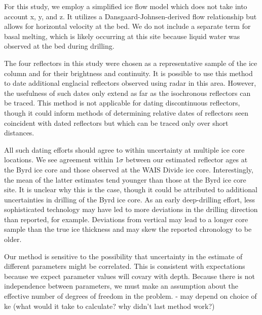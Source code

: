 For this study, we employ a simplified ice flow model which does not take into account x, y, and z. It utilizes a Dansgaard-Johnsen-derived flow relationship but allows for horizontal velocity at the bed. We do not include a separate term for basal melting, which is likely occurring at this site because liquid water was observed at the bed during drilling. 

The four reflectors in this study were chosen as a representative sample of the ice column and for their brightness and continuity. It is possible to use this method to date additional englacial reflectors observed using radar in this area. However, the usefulness of such dates only extend as far as the isochronous reflectors can be traced. This method is not applicable for dating discontinuous reflectors, though it could inform methods of determining relative dates of reflectors seen coincident with dated reflectors but which can be traced only over short distances. 

All such dating efforts should agree to within uncertainty at multiple ice core locations. We see agreement within 1$\sigma$ between our estimated reflector ages at the Byrd ice core and those observed at the WAIS Divide ice core. Interestingly, the mean of the latter estimates tend younger than those at the Byrd ice core site. It is unclear why this is the case, though it could be attributed to additional uncertainties in drilling of the Byrd ice core. As an early deep-drilling effort, less sophisticated technology may have led to more deviations in the drilling direction than reported, for example. Deviations from vertical may lead to a longer core sample than the true ice thickness and may skew the reported chronology to be older.

Our method is sensitive to the possibility that uncertainty in the estimate of different parameters might be correlated. This is consistent with expectations because we expect parameter values will covary with depth. Because there is not independence between parameters, we must make an assumption about the effective number of degrees of freedom in the problem. 
- may depend on choice of ke (what would it take to calculate? why didn't last method work?)



